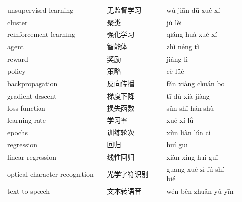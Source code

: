 \documentclass[11pt]{article}
\begin{document}
\begin{longtable}{@{}p{0.40\linewidth}p{0.24\linewidth}p{0.30\linewidth}@{}}
unsupervised learning & 无监督学习 & wú jiān dū xué xí \\
cluster & 聚类 & jù lèi \\
reinforcement learning & 强化学习 & qiáng huà xué xí \\
agent & 智能体 & zhì néng tǐ \\
reward & 奖励 & jiǎng lì \\
policy & 策略 & cè lüè \\
backpropagation & 反向传播 & fǎn xiàng chuán bō \\
gradient descent & 梯度下降 & tī dù xià jiàng \\
loss function & 损失函数 & sǔn shī hán shù \\
learning rate & 学习率 & xué xí lǜ \\
epochs & 训练轮次 & xùn liàn lún cì \\
regression & 回归 & huí guī \\
linear regression & 线性回归 & xiàn xìng huí guī \\
optical character recognition & 光学字符识别 & guāng xué zì fú shí bié \\
text-to-speech & 文本转语音 & wén běn zhuǎn yǔ yīn \\
\end{longtable}
\end{document}

